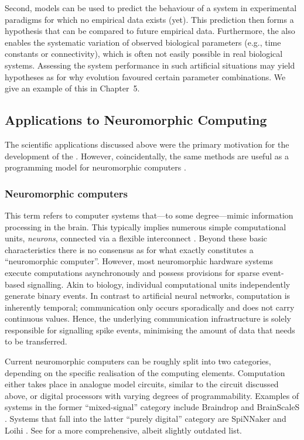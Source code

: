 Second, \NEF models can be used to predict the behaviour of a system in experimental paradigms for which no empirical data exists (yet).
This prediction then forms a hypothesis that can be compared to future empirical data.
Furthermore, the \NEF also enables the systematic variation of observed biological parameters (e.g., time constants or connectivity), which is often not easily possible in real biological systems.
Assessing the system performance in such artificial situations may yield hypotheses as for why evolution favoured certain parameter combinations.
We give an example of this in Chapter~5.

\subsection{Applications to Neuromorphic Computing}
\label{sec:neuromorphic}

The scientific applications discussed above were the primary motivation for the development of the \NEF \citep[Chapter~1]{eliasmith2003neural}.
However, coincidentally, the same methods are useful as a programming model for neuromorphic computers \citep{boahen2017neuromorph}.

\subsubsection{Neuromorphic computers}
This term refers to computer systems that---to some degree---mimic information processing in the brain.
This typically implies numerous simple computational units, \emph{neurons}, connected via a flexible interconnect \citep{furber2016largescale}.
Beyond these basic characteristics there is no consensus as for what exactly constitutes a \enquote{neuromorphic computer}.
However, most neuromorphic hardware systems execute computations asynchronously and possess provisions for sparse event-based signalling.
Akin to biology, individual computational units independently generate binary events.
In contrast to artificial neural networks, computation is inherently temporal; communication only occurs sporadically and does not carry continuous values.
Hence, the underlying communication infrastructure is solely responsible for signalling spike events, minimising the amount of data that needs to be transferred.

Current neuromorphic computers can be roughly split into two categories, depending on the specific realisation of the computing elements.
Computation either takes place in analogue model circuits, similar to the \LIF circuit discussed above, or digital processors with varying degrees of programmability.
Examples of systems in the former \enquote{mixed-signal} category include Braindrop \citep{neckar2019braindrop} and BrainScaleS \citep{schemmel2010waferscale}.
Systems that fall into the latter \enquote{purely digital} category are SpiNNaker \citep{furber2013overview} and Loihi \citep{davies2018loihi}. See \citet{furber2016largescale} for a more comprehensive, albeit slightly outdated list.

